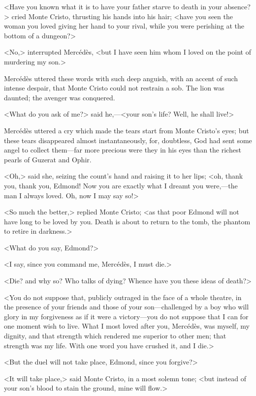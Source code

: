  <Have you known what it is to have your father starve to death in your absence?> cried Monte Cristo, thrusting his hands into his hair; <have you seen the woman you loved giving her hand to your rival, while you were perishing at the bottom of a dungeon?> 

 <No,> interrupted Mercédès, <but I have seen him whom I loved on the point of murdering my son.> 

 Mercédès uttered these words with such deep anguish, with an accent of such intense despair, that Monte Cristo could not restrain a sob. The lion was daunted; the avenger was conquered. 

 <What do you ask of me?> said he,—<your son's life? Well, he shall live!> 

 Mercédès uttered a cry which made the tears start from Monte Cristo's eyes; but these tears disappeared almost instantaneously, for, doubtless, God had sent some angel to collect them—far more precious were they in his eyes than the richest pearls of Guzerat and Ophir. 

 <Oh,> said she, seizing the count's hand and raising it to her lips; <oh, thank you, thank you, Edmond! Now you are exactly what I dreamt you were,—the man I always loved. Oh, now I may say so!> 

 <So much the better,> replied Monte Cristo; <as that poor Edmond will not have long to be loved by you. Death is about to return to the tomb, the phantom to retire in darkness.> 

 <What do you say, Edmond?> 

 <I say, since you command me, Mercédès, I must die.> 

 <Die? and why so? Who talks of dying? Whence have you these ideas of death?> 

 <You do not suppose that, publicly outraged in the face of a whole theatre, in the presence of your friends and those of your son—challenged by a boy who will glory in my forgiveness as if it were a victory—you do not suppose that I can for one moment wish to live. What I most loved after you, Mercédès, was myself, my dignity, and that strength which rendered me superior to other men; that strength was my life. With one word you have crushed it, and I die.> 

 <But the duel will not take place, Edmond, since you forgive?> 

 <It will take place,> said Monte Cristo, in a most solemn tone; <but instead of your son's blood to stain the ground, mine will flow.> 

